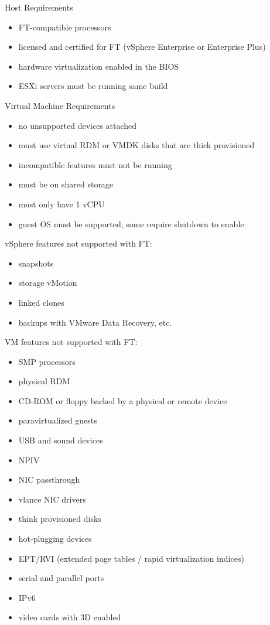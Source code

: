 Host Requirements

\begin{itemize}
\item FT-compatible processors
\item licensed and certified for FT (vSphere Enterprise or Enterprise Plus)
\item hardware virtualization enabled in the BIOS
\item ESXi servers must be running same build
\end{itemize}

Virtual Machine Requirements

\begin{itemize}
\item no unsupported devices attached
\item must use virtual RDM or VMDK disks that are thick provisioned
\item incompatible features must not be running
\item must be on shared storage
\item must only have 1 vCPU
\item guest OS must be supported, some require shutdown to enable
\end{itemize}

vSphere features not supported with FT:

\begin{itemize}
\item snapshots
\item storage vMotion
\item linked clones
\item backups with VMware Data Recovery, etc.
\end{itemize}

VM features not supported with FT:

\begin{itemize}
\item SMP processors
\item physical RDM
\item CD-ROM or floppy backed by a physical or remote device
\item paravirtualized guests
\item USB and sound devices
\item NPIV
\item NIC passthrough
\item vlance NIC drivers
\item think provisioned disks
\item hot-plugging devices
\item EPT/RVI (extended page tables / rapid virtualization indices)
\item serial and parallel ports
\item IPv6
\item video cards with 3D enabled
\end{itemize}

